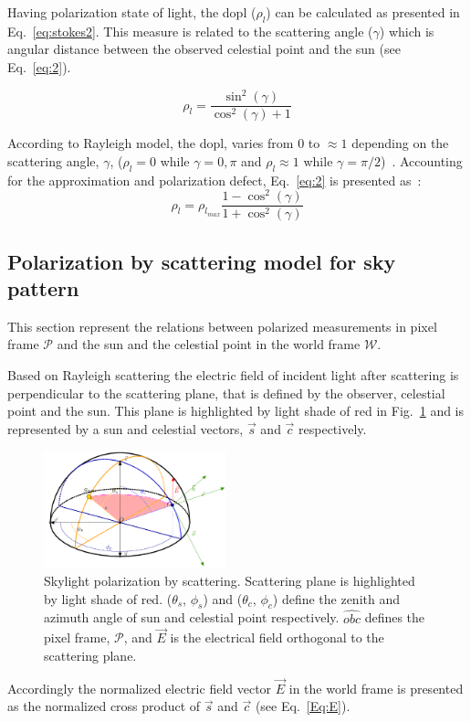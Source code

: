 Having polarization state of light, the \gls{dopl} ($\rho_{l}$) can be
calculated as presented in Eq.~\ref{eq:stokes2}. This measure is related to the
scattering angle ($\gamma$) which is angular distance between the observed
celestial point and the sun (see Eq.~\ref{eq:2}).

\begin{equation}
  \label{eq:2}
  \rho_{l} = \frac{\sin^{2}(\gamma)}{\cos^{
      2}(\gamma)+1}
\end{equation}

According to Rayleigh model, the \gls{dopl}, varies
from 0 to $\approx 1$ depending on the scattering angle, $\gamma$, ($\rho_{l} =
0$ while $\gamma = 0, \pi$ and $\rho_{l} \approx 1$ while $\gamma =
\pi/2$)~\cite{smith2007polarization, miyazaki09sunlightpolarization}.
Accounting for the approximation and polarization defect, Eq.~\ref{eq:2}
is presented as~\cite{pomozi2001clearsky}:
\begin{equation}
  \label{eq:3}
  \rho_{l} = \rho_{l_{max}}\frac{1 - \cos^{2}(\gamma)}{1 + \cos^{
      2}(\gamma)}
\end{equation}


\subsection{Polarization by scattering model for sky pattern}
\label{subsec:pscattering}
This section represent the relations between polarized measurements in pixel
frame $\mathcal{P}$ and the sun and the celestial point in the world frame
$\mathcal{W}$.

Based on Rayleigh scattering the electric field of incident light after
scattering is perpendicular to the scattering plane, that is defined by the
observer, celestial point and the sun.  This plane is highlighted by light
shade of red in Fig.~\ref{fig:scattering} and is represented by a sun and
celestial vectors, $\vec{s}$ and $\vec{c}$ respectively.

\begin{figure}
  \centering
  \includegraphics[width=0.47\textwidth]{./content/intro/figures/polasky-iros-small.png}
  \caption{Skylight polarization by scattering. Scattering plane is highlighted
  by light shade of red. ($\theta_s$, $\phi_s$) and ($\theta_c$, $\phi_c$)
  define the zenith and azimuth angle of sun and celestial point
  respectively. $\widehat{obc}$ defines the pixel frame, $\mathcal{P}$, and
  $\vec{E}$ is the electrical field orthogonal to the scattering plane.}
    \label{fig:scattering}
\end{figure}
Accordingly the normalized electric field vector $\vec{E}$ in the world frame
is presented as the normalized cross product of $\vec{s}$ and
$\vec{c}$ (see Eq.~\ref{Eq:E}).

